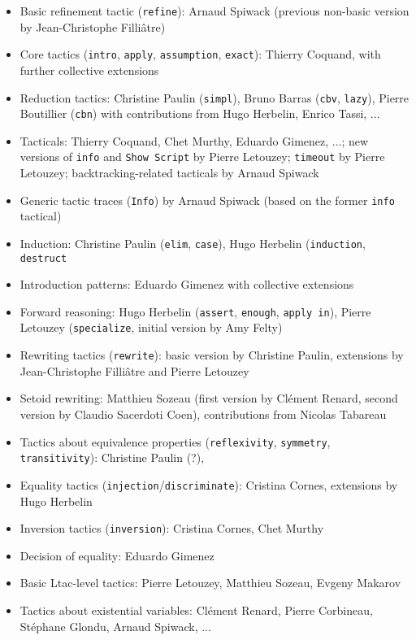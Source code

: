 \documentclass{article}
\begin{document}
\begin{itemize}
\item Basic refinement tactic (\texttt{refine}): Arnaud Spiwack (previous non-basic version by Jean-Christophe Filliâtre)
\item Core tactics (\texttt{intro}, \texttt{apply},
  \texttt{assumption}, \texttt{exact}): Thierry Coquand, with further
  collective extensions
\item Reduction tactics: Christine Paulin (\texttt{simpl}), Bruno
  Barras (\texttt{cbv}, \texttt{lazy}), Pierre Boutillier (\texttt{cbn})
  with contributions from Hugo Herbelin, Enrico Tassi, ...
\item Tacticals: Thierry Coquand, Chet Murthy, Eduardo Gimenez, ...;
  new versions of {\tt info} and {\tt Show Script} by Pierre Letouzey;
  {\tt timeout} by Pierre Letouzey; backtracking-related tacticals by Arnaud Spiwack
\item Generic tactic traces ({\tt Info}) by Arnaud Spiwack (based on the former {\tt info} tactical)
\item Induction: Christine Paulin (\texttt{elim}, \texttt{case}), Hugo Herbelin (\texttt{induction}, \texttt{destruct}
\item Introduction patterns: Eduardo Gimenez with collective extensions
\item Forward reasoning: Hugo Herbelin (\texttt{assert}, \texttt{enough}, \texttt{apply in}),
  Pierre Letouzey (\texttt{specialize}, initial version by Amy Felty)
\item Rewriting tactics (\texttt{rewrite}): basic version by Christine Paulin,
  extensions by Jean-Christophe Filliâtre and Pierre Letouzey
\item Setoid rewriting: Matthieu Sozeau (first version by Clément
  Renard, second version by Claudio Sacerdoti Coen), contributions
  from Nicolas Tabareau
\item Tactics about equivalence properties (\texttt{reflexivity},
  \texttt{symmetry}, \texttt{transitivity}): Christine Paulin (?),
\item Equality tactics (\texttt{injection}/\texttt{discriminate}): Cristina Cornes, extensions by Hugo Herbelin
\item Inversion tactics (\texttt{inversion}): Cristina Cornes, Chet Murthy
\item Decision of equality: Eduardo Gimenez
\item Basic Ltac-level tactics: Pierre Letouzey, Matthieu Sozeau,
  Evgeny Makarov
\item Tactics about existential variables: Clément Renard, Pierre Corbineau, Stéphane Glondu, Arnaud Spiwack, ...
\end{itemize}
\end{document}
